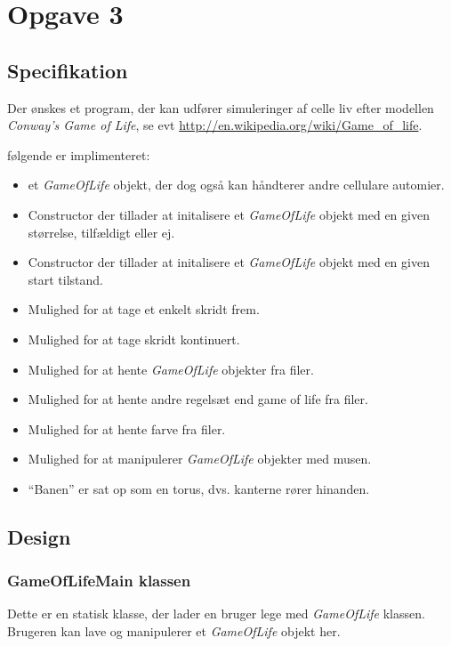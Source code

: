 \newcommand{\gol}{\emph{GameOfLife}}

\section{Opgave 3}

\subsection{Specifikation}
Der ønskes et program, der kan udfører simuleringer af celle liv efter modellen \emph{Conway's Game of Life},
se evt \url{http://en.wikipedia.org/wiki/Game_of_life}.

følgende er implimenteret:
\begin{itemize}
  \item et \emph{GameOfLife} objekt, der dog også kan håndterer andre cellulare automier.
  \item Constructor der tillader at initalisere et \emph{GameOfLife} objekt
  med en given størrelse, tilfældigt eller ej.
  \item Constructor der tillader at initalisere et \emph{GameOfLife} objekt
  med en given start tilstand.
  \item Mulighed for at tage et enkelt skridt frem.
  \item Mulighed for at tage skridt kontinuert.
  \item Mulighed for at hente \emph{GameOfLife} objekter fra filer.
  \item Mulighed for at hente andre regelsæt end game of life fra filer.
  \item Mulighed for at hente farve fra filer.
  \item Mulighed for at manipulerer \emph{GameOfLife} objekter med musen.
  \item ``Banen'' er sat op som en torus, dvs. kanterne rører hinanden.
\end{itemize}

\subsection{Design}

\subsubsection{ GameOfLifeMain klassen }
Dette er en statisk klasse, der lader en bruger lege med \emph{GameOfLife} klassen.
Brugeren kan lave og manipulerer et \emph{GameOfLife} objekt her.

